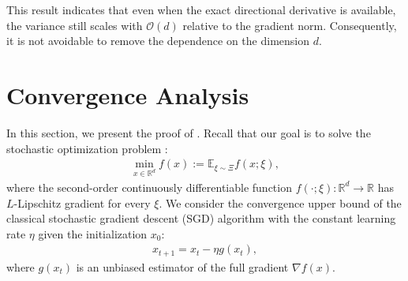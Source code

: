 \documentclass{article}
\newcommand{\EE}{\mathbb{E}}
\newcommand{\RR}{\mathbb{R}}
\theoremstyle{definition}
\theoremstyle{plain}
\theoremstyle{remark}
\begin{document}
This result indicates that even when the exact directional derivative is available, the variance still scales with \(\mathcal{O}(d)\) relative to the gradient norm. Consequently, it is not avoidable to remove the dependence on the dimension $d$.



\section{Convergence Analysis}
In this section, we present the proof of .  Recall that our goal is to solve the stochastic optimization problem :
\begin{align*} 
\min_{x \in \RR^d} f(x) := \EE_{\xi \sim \Xi} f(x;\xi),
\end{align*}
where the second-order continuously differentiable function $f(\cdot;\xi):\RR^d \to \RR$ has $L$-Lipschitz gradient for every $\xi$. We consider the convergence upper bound of the classical stochastic gradient descent (SGD) algorithm with the constant learning rate $\eta$ given the initialization $x_0$:
\begin{align}\label{eq:sgd-iteration}
   x_{t+1} = x_t - \eta g(x_t), \tag{SGD}
\end{align}
where $g(x_t)$ is an unbiased estimator of the full gradient $\nabla f(x)$. 
\end{document}
